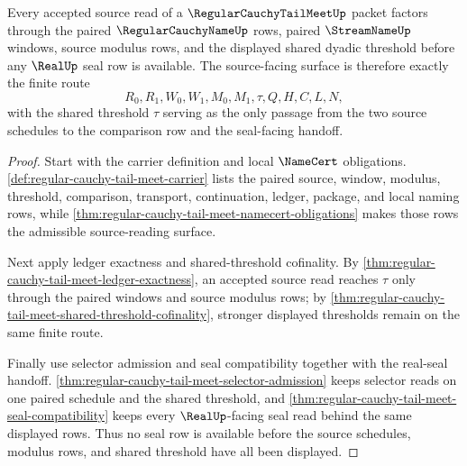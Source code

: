\begin{theorem}
\label{thm:regular-cauchy-tail-meet-source-scope}
Every accepted source read of a $\RegularCauchyTailMeetUp$ packet factors through the paired $\RegularCauchyNameUp$ rows, paired $\StreamNameUp$ windows, source modulus rows, and the displayed shared dyadic threshold before any $\RealUp$ seal row is available. The source-facing surface is therefore exactly the finite route
$$
R_0,R_1,W_0,W_1,M_0,M_1,\tau,Q,H,C,L,N,
$$
with the shared threshold $\tau$ serving as the only passage from the two source schedules to the comparison row and the seal-facing handoff.
\end{theorem}
\begin{proof}
Start with the carrier definition and local $\NameCert$ obligations. \autoref{def:regular-cauchy-tail-meet-carrier} lists the paired source, window, modulus, threshold, comparison, transport, continuation, ledger, package, and local naming rows, while \autoref{thm:regular-cauchy-tail-meet-namecert-obligations} makes those rows the admissible source-reading surface.

Next apply ledger exactness and shared-threshold cofinality. By \autoref{thm:regular-cauchy-tail-meet-ledger-exactness}, an accepted source read reaches $\tau$ only through the paired windows and source modulus rows; by \autoref{thm:regular-cauchy-tail-meet-shared-threshold-cofinality}, stronger displayed thresholds remain on the same finite route.

Finally use selector admission and seal compatibility together with the real-seal handoff. \autoref{thm:regular-cauchy-tail-meet-selector-admission} keeps selector reads on one paired schedule and the shared threshold, and \autoref{thm:regular-cauchy-tail-meet-seal-compatibility} keeps every $\RealUp$-facing seal read behind the same displayed rows. Thus no seal row is available before the source schedules, modulus rows, and shared threshold have all been displayed.
\end{proof}

